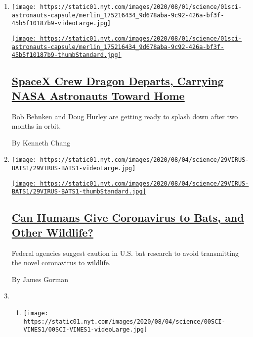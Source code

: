 \begin{enumerate}
\def\labelenumi{\arabic{enumi}.}
\item
  \texttt{[image: https://static01.nyt.com/images/2020/08/01/science/01sci-astronauts-capsule/merlin\_175216434\_9d678aba-9c92-426a-bf3f-45b5f10187b9-videoLarge.jpg]}

  \href{/2020/08/01/science/nasa-spacex-astronauts.html}{\texttt{[image: https://static01.nyt.com/images/2020/08/01/science/01sci-astronauts-capsule/merlin\_175216434\_9d678aba-9c92-426a-bf3f-45b5f10187b9-thumbStandard.jpg]}}

  \hypertarget{spacex-crew-dragon-departs-carrying-nasa-astronauts-toward-home}{%
  \subsection{\texorpdfstring{\href{/2020/08/01/science/nasa-spacex-astronauts.html}{SpaceX
  Crew Dragon Departs, Carrying NASA Astronauts Toward
  Home}}{SpaceX Crew Dragon Departs, Carrying NASA Astronauts Toward Home}}\label{spacex-crew-dragon-departs-carrying-nasa-astronauts-toward-home}}

  Bob Behnken and Doug Hurley are getting ready to splash down after two
  months in orbit.

  By Kenneth Chang
\item
  \texttt{[image: https://static01.nyt.com/images/2020/08/04/science/29VIRUS-BATS1/29VIRUS-BATS1-videoLarge.jpg]}

  \href{/2020/08/01/science/Covid-bats.html}{\texttt{[image: https://static01.nyt.com/images/2020/08/04/science/29VIRUS-BATS1/29VIRUS-BATS1-thumbStandard.jpg]}}

  \hypertarget{can-humans-give-coronavirus-to-bats-and-other-wildlife}{%
  \subsection{\texorpdfstring{\href{/2020/08/01/science/Covid-bats.html}{Can
  Humans Give Coronavirus to Bats, and Other
  Wildlife?}}{Can Humans Give Coronavirus to Bats, and Other Wildlife?}}\label{can-humans-give-coronavirus-to-bats-and-other-wildlife}}

  Federal agencies suggest caution in U.S. bat research to avoid
  transmitting the novel coronavirus to wildlife.

  By James Gorman
\item
  \begin{enumerate}
  \def\labelenumii{\arabic{enumii}.}
  \item
    \texttt{[image: https://static01.nyt.com/images/2020/08/04/science/00SCI-VINES1/00SCI-VINES1-videoLarge.jpg]}


\end{enumerate}
\end{enumerate}

